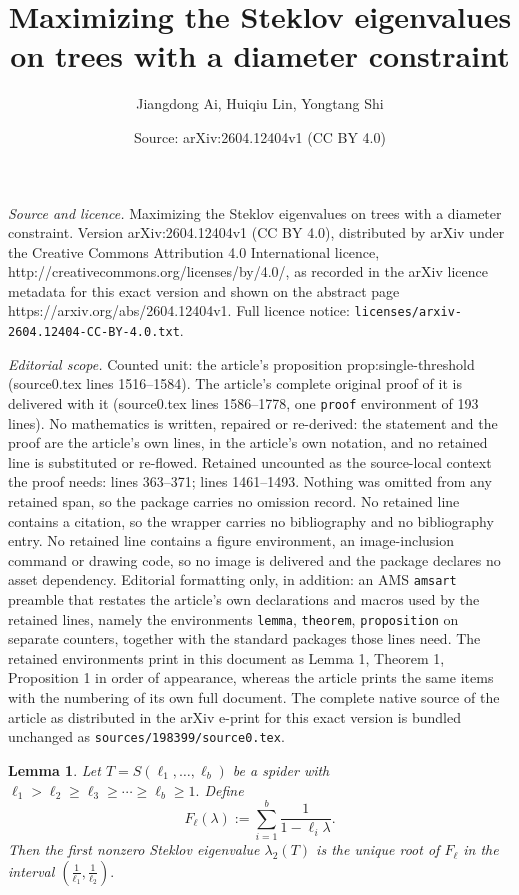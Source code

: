 \documentclass[10pt,a4paper]{amsart}
\title{Maximizing the Steklov eigenvalues on trees with a diameter constraint}
\author{Jiangdong Ai, Huiqiu Lin, Yongtang Shi}
\date{Source: arXiv:2604.12404v1 (CC BY 4.0)}
\newtheorem{lemma}{Lemma}
\begin{document}
\maketitle

\noindent\emph{Source and licence.} Maximizing the Steklov eigenvalues on trees with a diameter constraint. Version arXiv:2604.12404v1 (CC BY 4.0), distributed by arXiv under the Creative Commons Attribution 4.0 International licence, http://creativecommons.org/licenses/by/4.0/, as recorded in the arXiv licence metadata for this exact version and shown on the abstract page https://arxiv.org/abs/2604.12404v1. Full licence notice: \texttt{licenses/arxiv-2604.12404-CC-BY-4.0.txt}.\par\smallskip

\noindent\textit{Editorial scope.} Counted unit: the article's proposition prop:single-threshold (source0.tex lines 1516--1584). The article's complete original proof of it is delivered with it (source0.tex lines 1586--1778, one \texttt{proof} environment of 193 lines). No mathematics is written, repaired or re-derived: the statement and the proof are the article's own lines, in the article's own notation, and no retained line is substituted or re-flowed.  Retained uncounted as the source-local context the proof needs: lines 363--371; lines 1461--1493.  Nothing was omitted from any retained span, so the package carries no omission record.  No retained line contains a citation, so the wrapper carries no bibliography and no bibliography entry.  No retained line contains a figure environment, an image-inclusion command or drawing code, so no image is delivered and the package declares no asset dependency.  Editorial formatting only, in addition: an AMS \texttt{amsart} preamble that restates the article's own declarations and macros used by the retained lines, namely the environments \texttt{lemma}, \texttt{theorem}, \texttt{proposition} on separate counters, together with the standard packages those lines need.  The retained environments print in this document as Lemma 1, Theorem 1, Proposition 1 in order of appearance, whereas the article prints the same items with the numbering of its own full document.  The complete native source of the article as distributed in the arXiv e-print for this exact version is bundled unchanged as \texttt{sources/198399/source0.tex}.
\begin{lemma}\label{lem:spider-equation}
Let $T=S(\ell_1,\dots,\ell_b)$
be a spider with $\ell_1>\ell_2\ge \ell_3\ge \cdots \ge \ell_b\ge 1.$
Define $$
F_{\ell}(\lambda):=\sum_{i=1}^b \frac{1}{1-\ell_i\lambda}.
$$
Then the first nonzero Steklov eigenvalue $\lambda_2(T)$ is the unique root of $F_{\ell}$
in the interval $\left(\frac1{\ell_1},\frac1{\ell_2}\right).$
\end{lemma}
\end{document}
